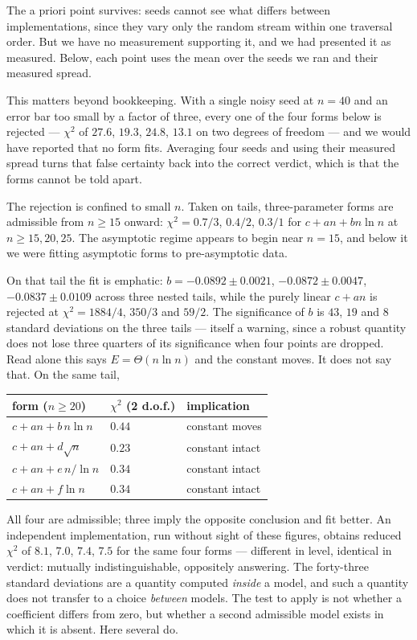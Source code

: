 \documentclass[11pt,a4paper]{article}
\begin{document}
The a priori point survives: seeds cannot see what differs between implementations, since they
vary only the random stream within one traversal order.  But we have no measurement supporting
it, and we had presented it as measured.  Below, each point uses the mean over the seeds we ran
and their measured spread.

This matters beyond bookkeeping.  With a single noisy seed at $n=40$ and an error bar too small
by a factor of three, every one of the four forms below is rejected --- $\chi^2$ of $27.6$,
$19.3$, $24.8$, $13.1$ on two degrees of freedom --- and we would have reported that no form
fits.  Averaging four seeds and using their measured spread turns that false certainty back into
the correct verdict, which is that the forms cannot be told apart.

The rejection is confined to small $n$.  Taken on tails, three-parameter forms are admissible
from $n\ge15$ onward: $\chi^2=0.7/3$, $0.4/2$, $0.3/1$ for $c+an+bn\ln n$ at $n\ge15,20,25$.
The asymptotic regime appears to begin near $n=15$, and below it we were fitting asymptotic forms
to pre-asymptotic data.

On that tail the fit is emphatic: $b=-0.0892\pm0.0021$, $-0.0872\pm0.0047$, $-0.0837\pm0.0109$
across three nested tails, while the purely linear $c+an$ is rejected at $\chi^2=1884/4$, $350/3$
and $59/2$.  The significance of $b$ is $43$, $19$ and $8$ standard deviations on the
three tails --- itself a warning, since a robust quantity does not lose three quarters of its
significance when four points are dropped.  Read alone this says $E=\Theta(n\ln n)$ and the constant
moves.  It does not say that.  On the same tail,
\begin{center}
\begin{tabular}{lll}
\toprule
form ($n\ge20$) & $\chi^2$ (2 d.o.f.) & implication\\
\midrule
$c+an+b\,n\ln n$ & $0.44$ & constant moves\\
$c+an+d\sqrt n$ & $0.23$ & constant intact\\
$c+an+e\,n/\ln n$ & $0.34$ & constant intact\\
$c+an+f\ln n$ & $0.34$ & constant intact\\
\bottomrule
\end{tabular}
\end{center}
All four are admissible; three imply the opposite conclusion and fit better.  An independent
implementation, run without sight of these figures, obtains reduced $\chi^2$ of $8.1$, $7.0$,
$7.4$, $7.5$ for the same four forms --- different in level, identical in verdict: mutually
indistinguishable, oppositely answering.  The forty-three
standard deviations are a quantity computed \emph{inside} a model, and such a quantity does not
transfer to a choice \emph{between} models.  The test to apply is not whether a coefficient
differs from zero, but whether a second admissible model exists in which it is absent.  Here
several do.
\end{document}
